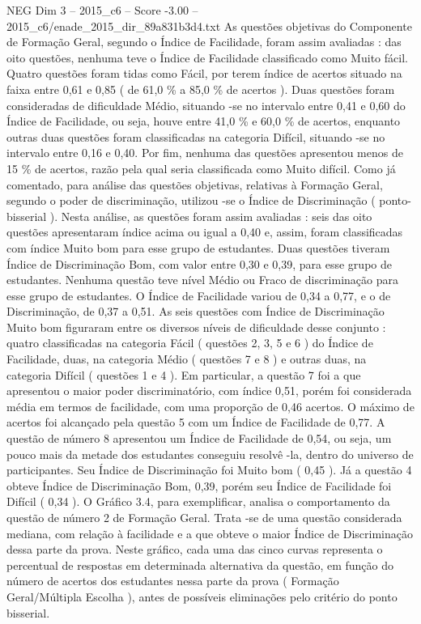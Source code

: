 \begin{textsample}{NEG Dim 3 – 2015\_c6 – Score -3.00 – 2015\_c6/enade\_2015\_dir\_89a831b3d4.txt}
As questões objetivas do Componente de Formação Geral, segundo o Índice de Facilidade, foram assim avaliadas : das oito questões, nenhuma teve o Índice de Facilidade classificado como Muito fácil.
Quatro questões foram tidas como Fácil, por terem índice de acertos situado na faixa entre 0,61 e 0,85 ( de 61,0 \% a 85,0 \% de acertos ).
Duas questões foram consideradas de dificuldade Médio, situando -se no intervalo entre 0,41 e 0,60 do Índice de Facilidade, ou seja, houve entre 41,0 \% e 60,0 \% de acertos, enquanto outras duas questões foram classificadas na categoria Difícil, situando -se no intervalo entre 0,16 e 0,40.
Por fim, nenhuma das questões apresentou menos de 15 \% de acertos, razão pela qual seria classificada como Muito difícil.
Como já comentado, para análise das questões objetivas, relativas à Formação Geral, segundo o poder de discriminação, utilizou -se o Índice de Discriminação ( ponto- bisserial ).
Nesta análise, as questões foram assim avaliadas : seis das oito questões apresentaram índice acima ou igual a 0,40 e, assim, foram classificadas com índice Muito bom para esse grupo de estudantes.
Duas questões tiveram Índice de Discriminação Bom, com valor entre 0,30 e 0,39, para esse grupo de estudantes.
Nenhuma questão teve nível Médio ou Fraco de discriminação para esse grupo de estudantes.
O Índice de Facilidade variou de 0,34 a 0,77, e o de Discriminação, de 0,37 a 0,51.
As seis questões com Índice de Discriminação Muito bom figuraram entre os diversos níveis de dificuldade desse conjunto : quatro classificadas na categoria Fácil ( questões 2, 3, 5 e 6 ) do Índice de Facilidade, duas, na categoria Médio ( questões 7 e 8 ) e outras duas, na categoria Difícil ( questões 1 e 4 ).
Em particular, a questão 7 foi a que apresentou o maior poder discriminatório, com índice 0,51, porém foi considerada média em termos de facilidade, com uma proporção de 0,46 acertos.
O máximo de acertos foi alcançado pela questão 5 com um Índice de Facilidade de 0,77.
A questão de número 8 apresentou um Índice de Facilidade de 0,54, ou seja, um pouco mais da metade dos estudantes conseguiu resolvê -la, dentro do universo de participantes.
Seu Índice de Discriminação foi Muito bom ( 0,45 ).
Já a questão 4 obteve Índice de Discriminação Bom, 0,39, porém seu Índice de Facilidade foi Difícil ( 0,34 ).
O Gráfico 3.4, para exemplificar, analisa o comportamento da questão de número 2 de Formação Geral.
Trata -se de uma questão considerada mediana, com relação à facilidade e a que obteve o maior Índice de Discriminação dessa parte da prova.
Neste gráfico, cada uma das cinco curvas representa o percentual de respostas em determinada alternativa da questão, em função do número de acertos dos estudantes nessa parte da prova ( Formação Geral/Múltipla Escolha ), antes de possíveis eliminações pelo critério do ponto bisserial.

\end{textsample}
